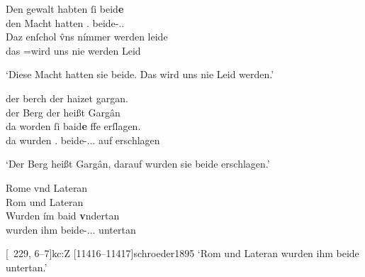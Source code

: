 \begin{exe}
\ex \label{ex:neutralpos}
	\gll Den gewalt habten ſi beid\textbf{e} \\
		den Macht hatten \Tpl\subM.\Nom{} beide-\Nom.\Pl\subM.\St{} \\
\sn \gll Daz enſchol v̂ns nímmer werden leide \\
		das \Neg=wird uns nie werden Leid \\
	\begin{taggedline}{\parencites%
		[\pno~13\ra, 41--42]{kc:B1}[vgl.]%
		[\pno~18\rb, 3]{kc:A1}
		[\pno~24\vb, 35]{kc:H}
		[\pno~32\ra, 3]{kc:M}
		[\pno~21\ra, 31]{kc:VB}
		[\pno~37\ra, 26]{kc:P}
		[\pno~23\rb, 5]{kc:C1}
		[\pno~25\rb, 39]{kc:K}
		[\pno~83\ra, 5]{kc:Z}
		[4261--4264]{schroeder1895}
	}
	\trans `Diese Macht hatten sie beide. Das wird uns nie Leid werden.'
	\end{taggedline}

\ex \label{ex:neutralpos2}
	\begin{xlist}
	\ex \label{ex:neutralpos2_1}
		\gll der berch der haizet gargan. \\
			der Berg der heißt Gargân \\
	\sn \gll da worden ſi baid\textbf{e} \textbf{}ffe erſlagen. \\
			da wurden \Tpl\subM.\Nom{} beide-\Nom.\Pl.\MascM.\St{} auf
				erschlagen \\
		\begin{taggedline}{\parencites%
			[\pno~33\rb, 28--30]{kc:A1}[vgl.]%
			[\pno~46\ra, 12]{kc:H}
			[\pno~58\vb, 15]{kc:M}
			[\pno~40\va, 15]{kc:C1}
			[\pno~46\va, 30]{kc:K}
			[\pno~152\va, 5]{kc:Z}
			[7704--7705]{schroeder1895}}
		\trans `Der Berg heißt Gargân, darauf wurden sie beide erschlagen.'
		\end{taggedline}

	\ex \label{ex:neutralpos2_2}
		\gll Rome vnd Lateran \\
			Rom und Lateran \\
	\sn \gll Wurden ím baid\textbf{} \textbf{v}ndertan \\
			wurden ihm beide-\Nom.\Pl.\NeutI.\St{} untertan \\
		\begin{taggedline}{\parencites%
			[\pno~68\vb, 13--14]{kc:K}[vgl.]%
			[\pno~49\vb, 15--16]{kc:A1}
			[\pno~69\ra, 29--30]{kc:H}
			[\pno~87\ra, 32--33]{kc:M}
			[\pno~31\vb, 18--19]{kc:B1}
			[\pno~82\va, 45--46]{kc:VB}
			[\pno~60\ra, 14--15]{kc:C1}
			[\pno~229\ra, 6--7]{kc:Z}
			[11416--11417]{schroeder1895}}
		\trans `Rom und Lateran wurden ihm beide untertan.'
		\end{taggedline}
		\\
	\end{xlist}
\end{exe}

